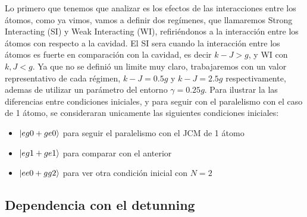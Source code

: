 Lo primero que tenemos que analizar es los efectos de las interacciones entre los átomos, como ya vimos,  vamos a definir dos regímenes, que llamaremos Strong Interacting (SI) y Weak Interacting (WI), refiriéndonos a la interacción entre los átomos con respecto a la cavidad. El SI sera cuando la interacción entre los átomos es fuerte en comparación con la cavidad, es decir $k-J>g$, y WI con $k,J<g$. Ya que no se definió un limite muy claro, trabajaremos con un valor representativo de cada régimen, $k-J=0.5g$ y $k-J=2.5g$ respectivamente, ademas de utilizar un parámetro del entorno $\gamma=0.25g$. Para ilustrar la las diferencias entre condiciones iniciales, y para seguir con el paralelismo con el caso de 1 átomo, se consideraran unicamente las siguientes condiciones iniciales:
\begin{itemize}
    \item $\ket{eg0+ge0}$ para seguir el paralelismo con el JCM de 1 átomo 
    \item $\ket{eg1+ge1}$ para comparar con el anterior 
    \item $\ket{ee0+gg2}$ para ver otra condición inicial con $N=2$ 
\end{itemize}
\subsection{Dependencia con el detunning}
